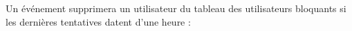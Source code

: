 \documentclass{article}
\begin{document}
\begin{enumerate}
\begin{enumerate}
\begin{enumerate}
        \vspace{0.4cm}
        \hspace*{-1.05in}
               \noindent{}
        
        \newpage
        Un événement supprimera un utilisateur du tableau des utilisateurs bloquants si les dernières tentatives datent d'une heure :
        
        \vspace{0.4cm}
        \hspace*{-1.05in}
               \noindent{}
        
        
        
        
        
         \end{enumerate}
        

\end{enumerate}
\end{enumerate}
\end{document}
